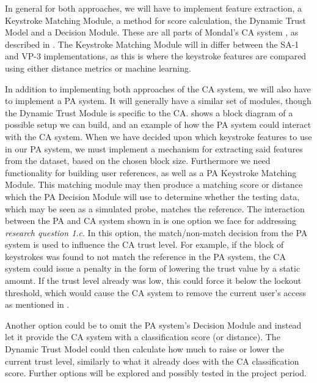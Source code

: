 \documentclass[informationsecurity]{gucmasterproject}
\begin{document}
In general for both approaches, we will have to implement feature extraction, a Keystroke Matching Module, a method for score calculation, the Dynamic Trust Model and a Decision Module.
These are all parts of Mondal's CA system \cite{mondal}, as described in .
The Keystroke Matching Module will in differ between the SA-1 and VP-3 implementations, as this is where the keystroke features are compared using either distance metrics or machine learning.

In addition to implementing both approaches of the CA system, we will also have to implement a PA system.
It will generally have a similar set of modules, though the Dynamic Trust Module is specific to the CA.
 shows a block diagram of a possible setup we can build, and an example of how the PA system could interact with the CA system.
When we have decided upon which keystroke features to use in our PA system, we must implement a mechanism for extracting said features from the dataset, based on the chosen block size.
Furthermore we need functionality for building user references, as well as a PA Keystroke Matching Module.
This matching module may then produce a matching score or distance which the PA Decision Module will use to determine whether the testing data, which may be seen as a simulated probe, matches the reference.
The interaction between the PA and CA system shown in  is one option we face for addressing \textit{research question 1.c}.
In this option, the match/non-match decision from the PA system is used to influence the CA trust level.
For example, if the block of keystrokes was found to not match the reference in the PA system, the CA system could issue a penalty in the form of lowering the trust value by a static amount.
If the trust level already was low, this could force it below the lockout threshold, which would cause the CA system to remove the current user's access as mentioned in .

Another option could be to omit the PA system's Decision Module and instead let it provide the CA system with a classification score (or distance).
The Dynamic Trust Model could then calculate how much to raise or lower the current trust level, similarly to what it already does with the CA classification score.
Further options will be explored and possibly tested in the project period.
\end{document}
